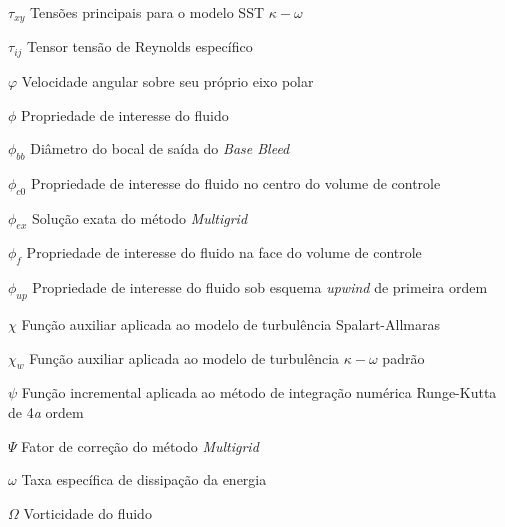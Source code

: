 \begin{simbolos}
  \item[\(\tau_{xy}\)] Tensões principais para o modelo SST \(\kappa-\omega\)
  \item[\(\tau_{ij}\)] Tensor tensão de Reynolds específico
  \item[\(\varphi\)] Velocidade angular sobre seu próprio eixo polar
  \item[\(\phi\)] Propriedade de interesse do fluido
  \item[\(\phi_{bb}\)] Diâmetro do bocal de saída do \textit{Base Bleed}
  \item[\(\phi_{c0}\)] Propriedade de interesse do fluido no centro do volume de controle
  \item[\(\phi_{ex}\)] Solução exata do método \textit{Multigrid}
  \item[\(\phi_f\)] Propriedade de interesse do fluido na face do volume de controle
  \item[\(\phi_{up}\)] Propriedade de interesse do fluido sob esquema \textit{upwind} de primeira ordem
  \item[\(\chi\)] Função auxiliar aplicada ao modelo de turbulência Spalart-Allmaras
  \item[\(\chi_w\)] Função auxiliar aplicada ao modelo de turbulência \(\kappa-\omega\) padrão
  \item[\(\psi\)] Função incremental aplicada ao método de integração numérica Runge-Kutta de 4\emph{a} ordem
  \item[\(\Psi\)] Fator de correção do método \textit{Multigrid}
  \item[\(\omega\)] Taxa específica de dissipação da energia
  \item[\(\Omega\)] Vorticidade do fluido
\end{simbolos}